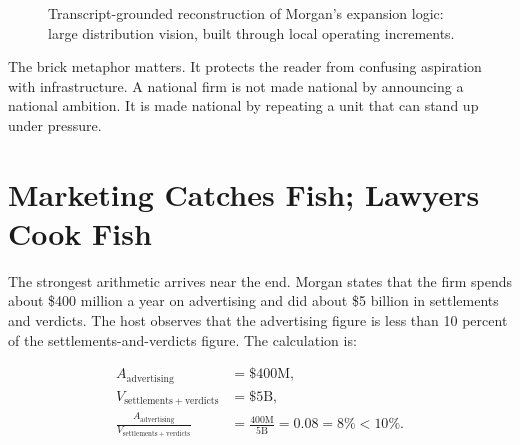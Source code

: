 \begin{figure}
\centering
{}
\caption{Transcript-grounded reconstruction of Morgan's expansion logic: large distribution vision, built through local operating increments.}
\end{figure}

The brick metaphor matters. It protects the reader from confusing aspiration with infrastructure. A national firm is not made national by announcing a national ambition. It is made national by repeating a unit that can stand up under pressure.

\section{Marketing Catches Fish; Lawyers Cook Fish}

The strongest arithmetic arrives near the end. Morgan states that the firm spends about \$400 million a year on advertising and did about \$5 billion in settlements and verdicts. The host observes that the advertising figure is less than 10 percent of the settlements-and-verdicts figure. The calculation is:

\begin{align}
A_{\mathrm{advertising}} &= \$400\mathrm{M},\\
V_{\mathrm{settlements+verdicts}} &= \$5\mathrm{B},\\
\frac{A_{\mathrm{advertising}}}{V_{\mathrm{settlements+verdicts}}}
&=
\frac{400\mathrm{M}}{5\mathrm{B}}
=
0.08
=
8\%
<
10\%.
\end{align}

